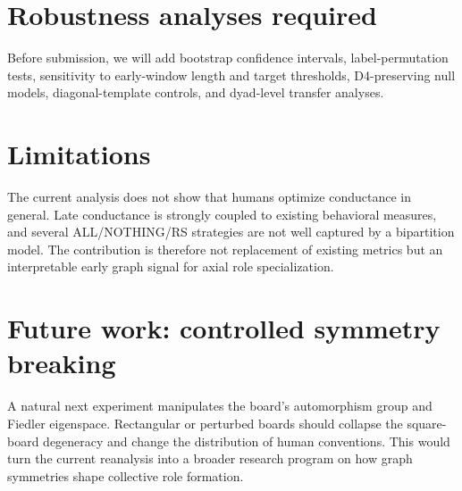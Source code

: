 \documentclass[11pt]{article}
\begin{document}
\section{Robustness analyses required}

Before submission, we will add bootstrap confidence intervals, label-permutation tests, sensitivity to early-window length and target thresholds, D4-preserving null models, diagonal-template controls, and dyad-level transfer analyses.

\section{Limitations}

The current analysis does not show that humans optimize conductance in general. Late conductance is strongly coupled to existing behavioral measures, and several ALL/NOTHING/RS strategies are not well captured by a bipartition model. The contribution is therefore not replacement of existing metrics but an interpretable early graph signal for axial role specialization.

\section{Future work: controlled symmetry breaking}

A natural next experiment manipulates the board's automorphism group and Fiedler eigenspace. Rectangular or perturbed boards should collapse the square-board degeneracy and change the distribution of human conventions. This would turn the current reanalysis into a broader research program on how graph symmetries shape collective role formation.
\end{document}
